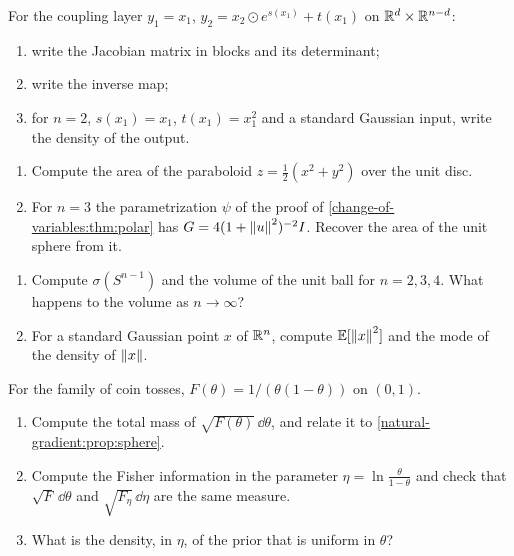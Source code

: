 \begin{notechapter}
\begin{exercise}\label{change-of-variables:exr:6}
For the coupling layer $y_1 = x_1$, $y_2 = x_2\odot e^{s(x_1)} + t(x_1)$
on $\mathbb{R}^{d}\times\mathbb{R}^{n-d}$:
\begin{enumerate}[nosep]
  \item write the Jacobian matrix in blocks and its determinant;
  \item write the inverse map;
  \item for $n = 2$, $s(x_1) = x_1$, $t(x_1) = x_1^2$ and a standard
        Gaussian input, write the density of the output.
\end{enumerate}
\end{exercise}

\begin{exercise}\label{change-of-variables:exr:7}
\begin{enumerate}[nosep]
  \item Compute the area of the paraboloid
        $z = \frac12(x^2 + y^2)$ over the unit disc.
  \item For $n = 3$ the parametrization $\psi$ of the proof of
        \cref{change-of-variables:thm:polar} has
        $G = 4(1 + \left\|u\right\|^2)^{-2}I$. Recover the area of the unit
        sphere from it.
\end{enumerate}
\end{exercise}

\begin{exercise}\label{change-of-variables:exr:8}
\begin{enumerate}[nosep]
  \item Compute $\sigma(S^{n-1})$ and the volume of the unit ball for
        $n = 2, 3, 4$. What happens to the volume as $n\to\infty$?
  \item For a standard Gaussian point $x$ of $\mathbb{R}^n$, compute
        $\mathbb{E}[\left\|x\right\|^2]$ and the mode of the density of $\left\|x\right\|$.
\end{enumerate}
\end{exercise}

\begin{exercise}\label{change-of-variables:exr:9}
For the family of coin tosses, $F(\theta) = 1/(\theta(1 - \theta))$ on
$(0, 1)$.
\begin{enumerate}[nosep]
  \item Compute the total mass of $\sqrt{F(\theta)}\,\dd\theta$, and
        relate it to \cref{natural-gradient:prop:sphere}.
  \item Compute the Fisher information in the parameter
        $\eta = \ln\frac\theta{1 - \theta}$ and check that
        $\sqrt{F}\,\dd\theta$ and $\sqrt{F_\eta}\,\dd\eta$ are the same
        measure.
  \item What is the density, in $\eta$, of the prior that is uniform
        in $\theta$?
\end{enumerate}
\end{exercise}


\end{notechapter}
